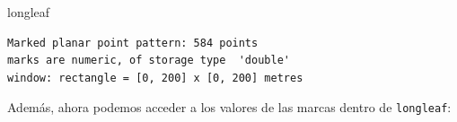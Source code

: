 \documentclass[
  letterpaper,
  DIV=11,
  numbers=noendperiod]{scrreprt}
\newenvironment{Shaded}{\begin{snugshade}}{\end{snugshade}}
\newcommand{\NormalTok}[1]{\textcolor[rgb]{0.00,0.23,0.31}{#1}}
\newcommand{\SpecialCharTok}[1]{\textcolor[rgb]{0.37,0.37,0.37}{#1}}
\begin{document}
\begin{Shaded}
\begin{Highlighting}[]
\NormalTok{longleaf}
\end{Highlighting}
\end{Shaded}

\begin{verbatim}
Marked planar point pattern: 584 points
marks are numeric, of storage type  'double'
window: rectangle = [0, 200] x [0, 200] metres
\end{verbatim}

Además, ahora podemos acceder a los valores de las marcas dentro de
\texttt{longleaf}:

\begin{Shaded}
\end{Shaded}
\end{document}
